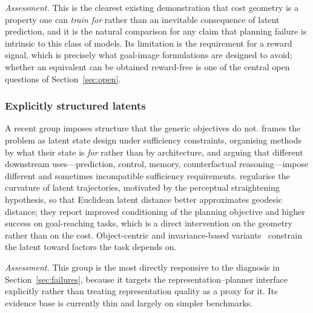 \documentclass[11pt,letterpaper]{article}
\begin{document}
\emph{Assessment.} This is the clearest existing demonstration that cost
geometry is a property one can \emph{train for} rather than an inevitable
consequence of latent prediction, and it is the natural comparison for any claim
that planning failure is intrinsic to this class of models. Its limitation is
the requirement for a reward signal, which is precisely what goal-image
formulations are designed to avoid; whether an equivalent can be obtained
reward-free is one of the central open questions of Section~\ref{sec:open}.

\subsubsection{Explicitly structured latents}

A recent group imposes structure that the generic objectives do not.
\citet{kim2026latentstate} frames the problem as latent state design under
sufficiency constraints, organising methods by what their state is \emph{for}
rather than by architecture, and arguing that different downstream
uses---prediction, control, memory, counterfactual reasoning---impose different
and sometimes incompatible sufficiency requirements.
\citet{straightening2026} regularise the curvature of latent trajectories,
motivated by the perceptual straightening hypothesis, so that Euclidean latent
distance better approximates geodesic distance; they report improved
conditioning of the planning objective and higher success on goal-reaching
tasks, which is a direct intervention on the geometry rather than on the cost.
Object-centric and invariance-based variants~\citep{causaljepa2026,
invariantjepwm2026} constrain the latent toward factors the task depends on.

\emph{Assessment.} This group is the most directly responsive to the diagnosis
in Section~\ref{sec:failures}, because it targets the representation--planner
interface explicitly rather than treating representation quality as a proxy for
it. Its evidence base is currently thin and largely on simpler benchmarks.
\end{document}

